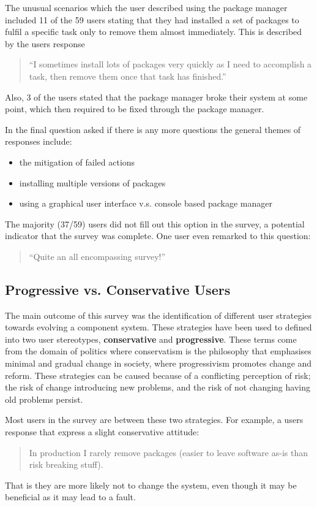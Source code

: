 The unusual scenarios which the user described using the package manager included 
11 of the 59 users stating that they had installed a set of packages to fulfil a specific task only to remove them almost immediately.
This is described by the users response 
\begin{quote}
``I sometimes install lots of packages very quickly as I need to accomplish a task, then remove them once that task has finished.''
\end{quote}

Also, 3 of the users stated that the package manager broke their system at some point, which then required to be fixed through the package manager.

In the final question asked if there is any more questions the general themes of responses include:
\begin{itemize}
  \item the mitigation of failed actions
  \item installing multiple versions of packages
  \item using a graphical user interface v.s. console based package manager
\end{itemize} 
The majority (37/59) users did not fill out this option in the survey, a potential indicator that the survey was complete.
One user even remarked to this question:
\begin{quote}
``Quite an all encompassing survey!''
\end{quote}

\subsection{Progressive vs. Conservative Users}
The main outcome of this survey was the identification of different user strategies towards evolving a component system.
These strategies have been used to defined into two user stereotypes, \textbf{conservative} and \textbf{progressive}.
These terms come from the domain of politics where conservatism is the philosophy that emphasises minimal and gradual change in society,
where progressivism promotes change and reform.
These strategies can be caused because of a conflicting perception of risk; the risk of change introducing new problems, and the risk of not changing having old problems persist.

Most users in the survey are between these two strategies. 
For example, a users response that express a slight conservative attitude:
\begin{quotation}
In production I rarely remove packages (easier to leave software as-is than risk breaking stuff).
\end{quotation}
That is they are more likely not to change the system, even though it may be beneficial as it may lead to a fault. 

